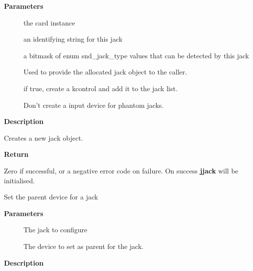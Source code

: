 \documentclass[a4paper,8pt,english]{sphinxmanual}
\begin{document}
\textbf{Parameters}
\begin{description}
\item[{}] \leavevmode
the card instance

\item[{}] \leavevmode
an identifying string for this jack

\item[{}] \leavevmode
a bitmask of enum snd\_jack\_type values that can be detected by
this jack

\item[{}] \leavevmode
Used to provide the allocated jack object to the caller.

\item[{}] \leavevmode
if true, create a kcontrol and add it to the jack list.

\item[{}] \leavevmode
Don't create a input device for phantom jacks.

\end{description}

\textbf{Description}

Creates a new jack object.

\textbf{Return}

Zero if successful, or a negative error code on failure.
On success \textbf{jjack} will be initialised.

\begin{fulllineitems}
\label{sound/kernel-api/alsa-driver-api:c.snd_jack_set_parent}
Set the parent device for a jack

\end{fulllineitems}


\textbf{Parameters}
\begin{description}
\item[{}] \leavevmode
The jack to configure

\item[{}] \leavevmode
The device to set as parent for the jack.

\end{description}

\textbf{Description}
\end{document}
